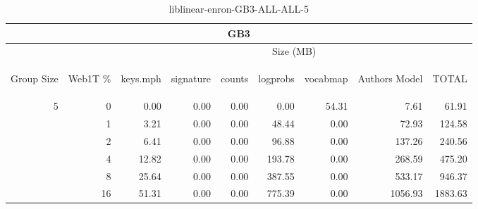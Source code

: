 \begin{center}
\begin{table}[htbp]
\begin{tabular}{ | r | r | r | r | r | r | r | r | r |}
\hline
\multicolumn{9}{|c|}{GB3}\\
\hline
 & & \multicolumn{7}{|c|}{Size (MB)}\\ \cline{3-9}
\begin{sideways}Group Size\end{sideways} & \begin{sideways}Web1T \% \end{sideways} & \begin{sideways}keys.mph\end{sideways} & \begin{sideways}signature\end{sideways} & \begin{sideways}counts\end{sideways} & \begin{sideways}logprobs\end{sideways} & \begin{sideways}vocabmap\end{sideways} & \begin{sideways}Authors Model \end{sideways} & \begin{sideways}TOTAL\end{sideways}\\
\hline
\multirow{5}{*}{5}
 & 0 & 0.00 & 0.00 & 0.00 & 0.00 & 54.31 & 7.61 & 61.91\\ \cline{2-9}
 & 1 & 3.21 & 0.00 & 0.00 & 48.44 & 0.00 & 72.93 & 124.58\\ \cline{2-9}
 & 2 & 6.41 & 0.00 & 0.00 & 96.88 & 0.00 & 137.26 & 240.56\\ \cline{2-9}
 & 4 & 12.82 & 0.00 & 0.00 & 193.78 & 0.00 & 268.59 & 475.20\\ \cline{2-9}
 & 8 & 25.64 & 0.00 & 0.00 & 387.55 & 0.00 & 533.17 & 946.37\\ \cline{2-9}
 & 16 & 51.31 & 0.00 & 0.00 & 775.39 & 0.00 & 1056.93 & 1883.63\\ \cline{2-9}
\hline
\end{tabular}
\caption{liblinear-enron-GB3-ALL-ALL-5}
\label{table:liblinear-enron-GB3-ALL-ALL-5}
\end{table}
\end{center}

